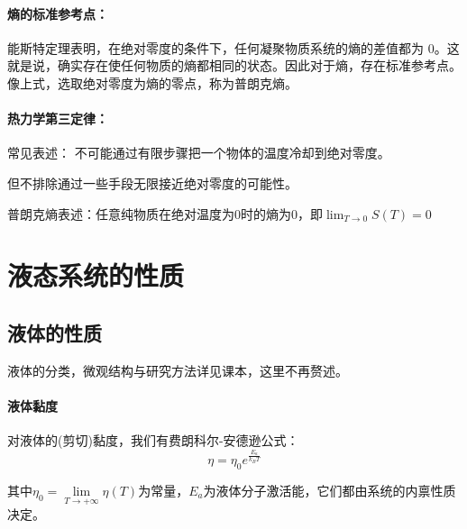 \documentclass[zihao=5,UTF8]{report}
\begin{document}
\subsubsection{熵的标准参考点：}

{\par\color{gray}\small
能斯特定理表明，在绝对零度的条件下，任何凝聚物质系统的熵的差值都为 0。这就是说，确实存在使任何物质的熵都相同的状态。因此对于熵，存在标准参考点。像上式，选取绝对零度为熵的零点，称为普朗克熵。
\par}
\subsubsection{热力学第三定律：}
 常见表述：
不可能通过有限步骤把一个物体的温度冷却到绝对零度。
{\par\color{gray}\small
但不排除通过一些手段无限接近绝对零度的可能性。
\par}
 普朗克熵表述：任意纯物质在绝对温度为0时的熵为0，即$\lim_{T\rightarrow 0} S(T) = 0$\par

\chapter{液态系统的性质}
\section{液体的性质}
液体的分类，微观结构与研究方法详见课本，这里不再赘述。
\subsubsection{液体黏度}
对液体的(剪切)黏度，我们有费朗科尔-安德逊公式：
\begin{equation}
\eta = \eta_0e^{\frac{E_a}{k_BT}}
\end{equation}
{\par\color{gray}\small
其中$\eta_0 = \underset{{T\rightarrow+\infty}}{\lim} \eta(T)$为常量，$E_a$为液体分子激活能，它们都由系统的内禀性质决定。
\par}
\end{document}
